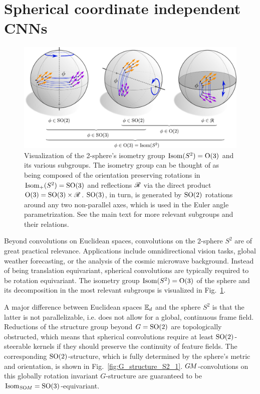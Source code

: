 

\section{Spherical coordinate independent CNNs}
\label{sec:instantiations_spherical}

\begin{figure}
    \centering
    \includegraphics[width=1.\textwidth]{figures/isometry_sphere.pdf}
    \caption{\small
        Visualization of the 2-sphere's isometry group $\operatorname{Isom}(S^2) = \operatorname{O}(3)$ and its various subgroups.
        The isometry group can be thought of as being composed of the orientation preserving rotations in $\operatorname{Isom}_+(S^2) = \operatorname{SO}(3)$ and reflections $\mathscr{R}$ via the direct product $\operatorname{O}(3) = \operatorname{SO}(3) \times \mathscr{R}$.
        $\operatorname{SO}(3)$, in turn, is generated by $\operatorname{SO}(2)$ rotations around any two non-parallel axes, which is used in the Euler angle parametrization.
        See the main text for more relevant subgroups and their relations.
    }
    \label{fig:isometries_sphere}
\end{figure}


Beyond convolutions on Euclidean spaces, convolutions on the 2-sphere $S^2$ are of great practical relevance.
Applications include omnidirectional vision tasks,  global weather forecasting, or the analysis of the cosmic microwave background.
Instead of being translation equivariant, spherical convolutions are typically required to be rotation equivariant.
The isometry group $\operatorname{Isom}(S^2) = \operatorname{O}(3)$ of the sphere and its decomposition in the most relevant subgroups is visualized in Fig.~\ref{fig:isometries_sphere}.

A major difference between Euclidean spaces $\mathbb{E}_d$ and the sphere $S^2$ is that the latter is not parallelizable, i.e. does not allow for a global, continuous frame field.
Reductions of the structure group beyond $G=\operatorname{SO}(2)$ are topologically obstructed, which means that spherical convolutions require at least $\operatorname{SO}(2)$-steerable kernels if they should preserve the continuity of feature fields.
The corresponding $\operatorname{SO}(2)$-structure, which is fully determined by the sphere's metric and orientation, is shown in Fig.~\ref{fig:G_structure_S2_1}.
$G\mkern-1.4muM$-convolutions on this globally rotation invariant $G$-structure are guaranteed to be $\operatorname{Isom}_{\mkern1mu\operatorname{SO}\mkern-3.6muM} = \operatorname{SO}(3)$-equivariant.

